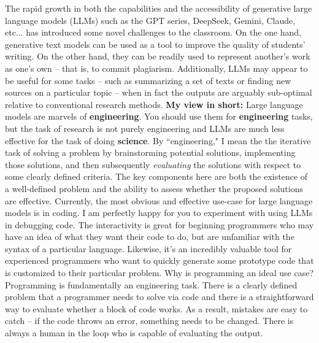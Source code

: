 \documentclass[11pt, article, oneside]{memoir}
\theoremstyle{Assumption}
\begin{document}
The rapid growth in both the capabilities and the accessibility of generative large language models (LLMs) such as the GPT series, DeepSeek, Gemini, Claude, etc... has introduced some novel challenges to the classroom. On the one hand, generative text models can be used as a tool to improve the quality of students' writing. On the other hand, they can be readily used to represent another's work as one's own -- that is, to commit plagiarism. Additionally, LLMs may appear to be useful for some tasks -- such as summarizing a set of texts or finding new sources on a particular topic -- when in fact the outputs are arguably sub-optimal relative to conventional research methods.
\newline\newline
\textbf{My view in short:} Large language models are marvels of \textbf{engineering}. You should use them for \textbf{engineering} tasks, but the task of research is not purely engineering and LLMs are much less effective for the task of doing \textbf{science}.
\newline\newline
By ``engineering," I mean the the iterative task of solving a problem by brainstorming potential solutions, implementing those solutions, and then subsequently \textit{evaluating} the solutions with respect to some clearly defined criteria. The key components here are both the existence of a well-defined problem and the ability to assess whether the proposed solutions are effective.
\newline\newline
Currently, the most obvious and effective use-case for large language models is in coding. I am perfectly happy for you to experiment with using LLMs in debugging code. The interactivity is great for beginning programmers who may have an idea of what they want their code to do, but are unfamiliar with the syntax of a particular language. Likewise, it's an incredibly valuable tool for experienced programmers who want to quickly generate some prototype code that is customized to their particular problem.
\newline\newline
Why is programming an ideal use case? Programming is fundamentally an engineering task. There is a clearly defined problem that a programmer needs to solve via code and there is a straightforward way to evaluate whether a block of code works. As a result, mistakes are easy to catch -- if the code throws an error, something needs to be changed. There is always a human in the loop who is capable of evaluating the output.
\end{document}
